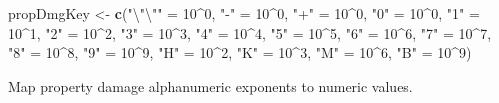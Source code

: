 \documentclass[]{article}
\newenvironment{Shaded}{\begin{snugshade}}{\end{snugshade}}
\newcommand{\CharTok}[1]{\textcolor[rgb]{0.31,0.60,0.02}{#1}}
\newcommand{\DecValTok}[1]{\textcolor[rgb]{0.00,0.00,0.81}{#1}}
\newcommand{\KeywordTok}[1]{\textcolor[rgb]{0.13,0.29,0.53}{\textbf{#1}}}
\newcommand{\NormalTok}[1]{#1}
\newcommand{\OperatorTok}[1]{\textcolor[rgb]{0.81,0.36,0.00}{\textbf{#1}}}
\newcommand{\StringTok}[1]{\textcolor[rgb]{0.31,0.60,0.02}{#1}}
\begin{document}
\begin{Shaded}
\begin{Highlighting}[]
\NormalTok{propDmgKey <-}\StringTok{  }\KeywordTok{c}\NormalTok{(}\StringTok{"}\CharTok{\textbackslash{}"\textbackslash{}"}\StringTok{"}\NormalTok{ =}\StringTok{ }\DecValTok{10}\OperatorTok{^}\DecValTok{0}\NormalTok{,}
                 \StringTok{"-"}\NormalTok{ =}\StringTok{ }\DecValTok{10}\OperatorTok{^}\DecValTok{0}\NormalTok{, }
                 \StringTok{"+"}\NormalTok{ =}\StringTok{ }\DecValTok{10}\OperatorTok{^}\DecValTok{0}\NormalTok{,}
                 \StringTok{"0"}\NormalTok{ =}\StringTok{ }\DecValTok{10}\OperatorTok{^}\DecValTok{0}\NormalTok{,}
                 \StringTok{"1"}\NormalTok{ =}\StringTok{ }\DecValTok{10}\OperatorTok{^}\DecValTok{1}\NormalTok{,}
                 \StringTok{"2"}\NormalTok{ =}\StringTok{ }\DecValTok{10}\OperatorTok{^}\DecValTok{2}\NormalTok{,}
                 \StringTok{"3"}\NormalTok{ =}\StringTok{ }\DecValTok{10}\OperatorTok{^}\DecValTok{3}\NormalTok{,}
                 \StringTok{"4"}\NormalTok{ =}\StringTok{ }\DecValTok{10}\OperatorTok{^}\DecValTok{4}\NormalTok{,}
                 \StringTok{"5"}\NormalTok{ =}\StringTok{ }\DecValTok{10}\OperatorTok{^}\DecValTok{5}\NormalTok{,}
                 \StringTok{"6"}\NormalTok{ =}\StringTok{ }\DecValTok{10}\OperatorTok{^}\DecValTok{6}\NormalTok{,}
                 \StringTok{"7"}\NormalTok{ =}\StringTok{ }\DecValTok{10}\OperatorTok{^}\DecValTok{7}\NormalTok{,}
                 \StringTok{"8"}\NormalTok{ =}\StringTok{ }\DecValTok{10}\OperatorTok{^}\DecValTok{8}\NormalTok{,}
                 \StringTok{"9"}\NormalTok{ =}\StringTok{ }\DecValTok{10}\OperatorTok{^}\DecValTok{9}\NormalTok{,}
                 \StringTok{"H"}\NormalTok{ =}\StringTok{ }\DecValTok{10}\OperatorTok{^}\DecValTok{2}\NormalTok{,}
                 \StringTok{"K"}\NormalTok{ =}\StringTok{ }\DecValTok{10}\OperatorTok{^}\DecValTok{3}\NormalTok{,}
                 \StringTok{"M"}\NormalTok{ =}\StringTok{ }\DecValTok{10}\OperatorTok{^}\DecValTok{6}\NormalTok{,}
                 \StringTok{"B"}\NormalTok{ =}\StringTok{ }\DecValTok{10}\OperatorTok{^}\DecValTok{9}\NormalTok{)}
\end{Highlighting}
\end{Shaded}

Map property damage alphanumeric exponents to numeric values.
\end{document}
